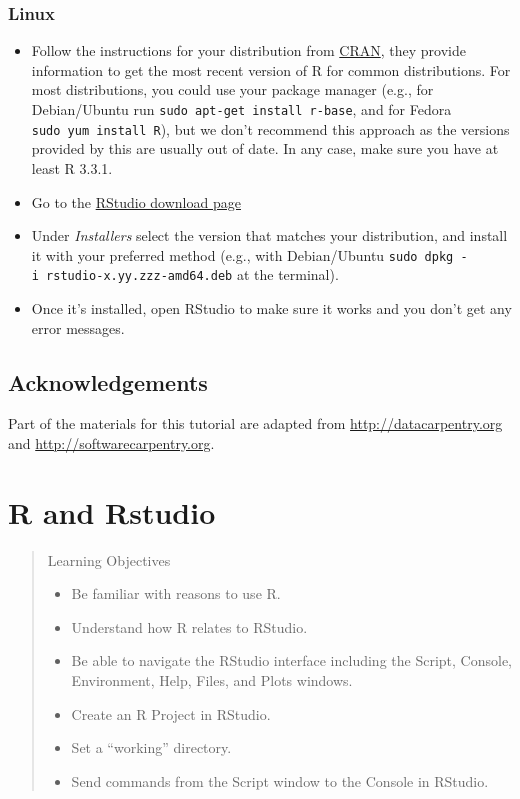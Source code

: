\documentclass[
]{book}
\providecommand{\tightlist}{%
  \setlength{\itemsep}{0pt}\setlength{\parskip}{0pt}}
\begin{document}
\hypertarget{linux}{%
\subsection*{Linux}\label{linux}}

\begin{itemize}
\tightlist
\item
  Follow the instructions for your distribution
  from \href{https://cloud.r-project.org/bin/linux}{CRAN}, they provide information
  to get the most recent version of R for common distributions. For most
  distributions, you could use your package manager (e.g., for Debian/Ubuntu run
  \texttt{sudo\ apt-get\ install\ r-base}, and for Fedora \texttt{sudo\ yum\ install\ R}), but we
  don't recommend this approach as the versions provided by this are
  usually out of date. In any case, make sure you have at least R 3.3.1.
\item
  Go to the
  \href{https://www.rstudio.com/products/rstudio/download/\#download}{RStudio download page}
\item
  Under \emph{Installers} select the version that matches your distribution, and
  install it with your preferred method (e.g., with Debian/Ubuntu \texttt{sudo\ dpkg\ -i\ rstudio-x.yy.zzz-amd64.deb} at the terminal).
\item
  Once it's installed, open RStudio to make sure it works and you don't get any
  error messages.
\end{itemize}

\hypertarget{acknowledgements}{%
\section*{Acknowledgements}\label{acknowledgements}}

Part of the materials for this tutorial are adapted from \url{http://datacarpentry.org} and \url{http://softwarecarpentry.org}.

\hypertarget{backgroud}{%
\chapter{R and Rstudio}\label{backgroud}}

\begin{quote}
Learning Objectives

\begin{itemize}
\tightlist
\item
  Be familiar with reasons to use R.
\item
  Understand how R relates to RStudio.
\item
  Be able to navigate the RStudio interface including the Script, Console, Environment, Help, Files, and Plots windows.
\item
  Create an R Project in RStudio.
\item
  Set a ``working'' directory.
\item
  Send commands from the Script window to the Console in RStudio.
\end{itemize}
\end{quote}
\end{document}

